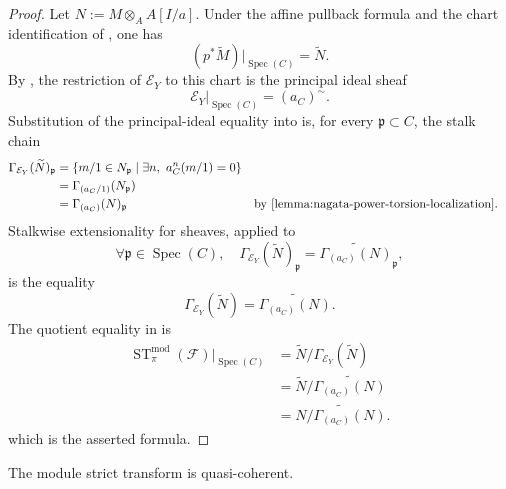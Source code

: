 \begin{proof}
  Let $N:=M\otimes_AA[I/a]$.  Under the affine pullback formula and the chart
  identification of
  , one has
  \[
    (p^*\widetilde M)|_{\operatorname{Spec}(C)}=\widetilde N.
  \]
  By , the restriction of
  $\mathcal E_Y$ to this chart is the principal ideal sheaf
  \[
    \mathcal E_Y|_{\operatorname{Spec}(C)}=(a_C)^{\sim}.
  \]
  Substitution of the principal-ideal equality into
   is, for every
  $\mathfrak p\subset C$, the stalk chain
  \[
  \begin{aligned}
    \Gamma_{\mathcal E_Y}(\widetilde N)_{\mathfrak p}
      &=\{m/1\in N_{\mathfrak p}\mid
           \exists n,\ a_C^n(m/1)=0\}\\
      &=\Gamma_{(a_C/1)}(N_{\mathfrak p})\\
      &=\Gamma_{(a_C)}(N)_{\mathfrak p}
        &&\text{by \Cref{lemma:nagata-power-torsion-localization}}.
  \end{aligned}
  \]
  Stalkwise extensionality for sheaves, applied to
  \[
    \forall\mathfrak p\in\operatorname{Spec}(C),\quad
    \Gamma_{\mathcal E_Y}(\widetilde N)_{\mathfrak p}
      =\widetilde{\Gamma_{(a_C)}(N)}_{\mathfrak p},
  \]
  is the equality
  \[
    \Gamma_{\mathcal E_Y}(\widetilde N)
      =\widetilde{\Gamma_{(a_C)}(N)}.
  \]
  The quotient equality in
   is
  \[
  \begin{aligned}
    \operatorname{ST}^{\mathrm{mod}}_\pi(\mathcal F)
      |_{\operatorname{Spec}(C)}
      &=\widetilde N\big/
        \Gamma_{\mathcal E_Y}(\widetilde N)\\
      &=\widetilde N\big/
        \widetilde{\Gamma_{(a_C)}(N)}\\
      &=\widetilde{N/\Gamma_{(a_C)}(N)}.
  \end{aligned}
  \]
  which is the asserted formula.
\end{proof}

\begin{lemma}
  \label{lemma:nagata-module-strict-transform-qc}

  The module strict transform is quasi-coherent.
\end{lemma}

